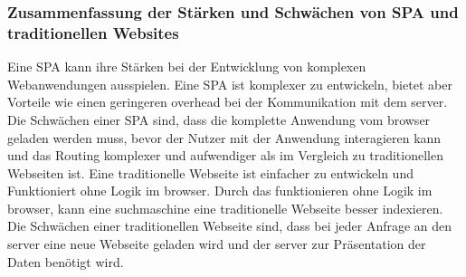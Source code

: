 \subsubsection*{Zusammenfassung der Stärken und Schwächen von \ac{SPA} und traditionellen Websites}
Eine \ac{SPA} kann ihre Stärken bei der Entwicklung von komplexen Webanwendungen ausspielen.
Eine \ac{SPA} ist komplexer zu entwickeln, bietet aber Vorteile wie einen geringeren \gls{overhead} bei der Kommunikation mit dem \gls{server}.
Die Schwächen einer \ac{SPA} sind, dass die komplette Anwendung vom \gls{browser} geladen werden muss, bevor der Nutzer mit der Anwendung interagieren kann
und das Routing komplexer und aufwendiger als im Vergleich zu traditionellen Webseiten ist.
Eine traditionelle Webseite ist einfacher zu entwickeln und Funktioniert ohne Logik im \gls{browser}.
Durch das funktionieren ohne Logik im \gls{browser}, kann eine \gls{suchmaschine} eine traditionelle Webseite besser indexieren.
Die Schwächen einer traditionellen Webseite sind, dass bei jeder Anfrage an den \gls{server} eine neue Webseite geladen wird und der \gls{server} zur Präsentation der Daten benötigt wird.